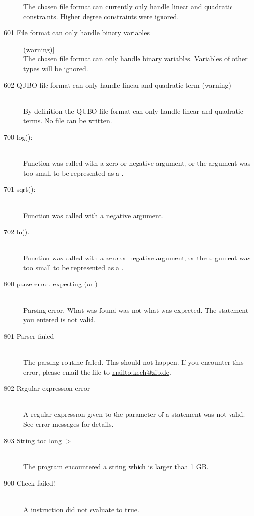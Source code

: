 \begin{description}
  The chosen file format can currently only handle linear and
  quadratic constraints. Higher degree constraints were ignored.
\item[601 File format can only handle binary variables] (warning)]\ \\
  The chosen file format can only handle binary variables. 
  Variables of other types will be ignored.
\item[602 QUBO file format can only handle linear and quadratic term
         (warning)]\ \\
  By definition the QUBO file format can only handle linear and
  quadratic terms. No file can be written.
%
%
% 
%
\item[700 log(): \code{OS specific domain or range error message}]\ \\
  Function  was called with a zero or negative argument, or
the argument was too small to be represented as a .
\item[701 sqrt(): \code{OS specific domain error message}]\ \\
  Function  was called with a negative argument.
\item[702 ln(): \code{OS specific domain or range error message}]\ \\
  Function  was called with a zero or negative argument, or
  the argument was too small to be represented as a .
\item[800 parse error: expecting \code{xxx} (or \code{yyy})]\ \\
  Parsing error. What was found was not what was expected.
  The statement you entered is not valid.
\item[801 Parser failed]\ \\
  The parsing routine failed. This should not happen. If you encounter
  this error, please email the  file to \url{mailto:koch@zib.de}.
\item[802 Regular expression error]\ \\
  A regular expression given to the  parameter of a
   statement was not valid. See error messages for details.
\item[803 String too long \code{xxx} $>$ \code{yyy}]\ \\
  The program encountered a string which is larger than 1 GB. 
%
%
\item[900 Check failed!]\ \\
  A  instruction did not evaluate to true. 
\end{description}

